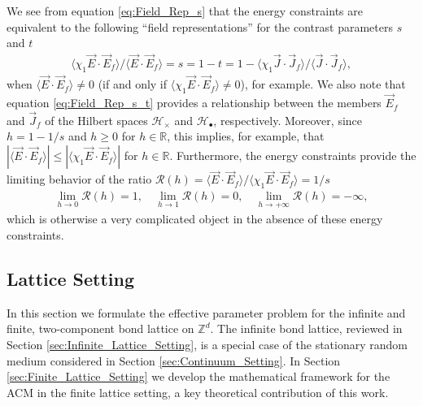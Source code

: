 \documentclass{cmslatex}
\begin{document}
 We see from equation \eqref{eq:Field_Rep_s} that the energy
 constraints are equivalent to the following ``field representations''
 for the contrast parameters $s$ and $t$
%
\begin{align}\label{eq:Field_Rep_s_t}
  \langle\chi_1\vec{E}\cdot\vec{E}_f\rangle/\langle\vec{E}\cdot\vec{E}_f\rangle
  =s=1-t
  =1- \langle\chi_1\vec{J}\cdot\vec{J}_f\rangle/\langle\vec{J}\cdot\vec{J}_f\rangle,
\end{align}
%
when $\langle\vec{E}\cdot\vec{E}_f\rangle\neq0$ (if and only if
$\langle\chi_1\vec{E}\cdot\vec{E}_f\rangle\neq0$), for example. We also note that equation 
\eqref{eq:Field_Rep_s_t} provides a relationship between the
members $\vec{E}_f$ and $\vec{J}_f$ of the Hilbert spaces
$\mathscr{H}_\times$ and $\mathscr{H}_{\bullet}$, respectively. Moreover, since
$h=1-1/s$ and $h\geq0$ for $h\in\mathbb{R}$, this implies, for example,
that $|\langle\vec{E}\cdot\vec{E}_f\rangle|\leq|\langle\chi_1\vec{E}\cdot\vec{E}_f\rangle|$ for
$h\in\mathbb{R}$. Furthermore, the energy constraints provide the
limiting behavior of the ratio
$\mathcal{R}(h)=\langle\vec{E}\cdot\vec{E}_f\rangle/\langle\chi_1\vec{E}\cdot\vec{E}_f\rangle=1/s$  
%
\begin{align*}
  \lim_{h\to0}\mathcal{R}(h)=1, \quad
  \lim_{h\to1}\mathcal{R}(h)=0, \quad
  \lim_{h\to+\infty}\mathcal{R}(h)=-\infty,
\end{align*}
%
which is otherwise a very complicated object in the absence of these
energy constraints.





\subsection{Lattice Setting}
\label{sec:Lattice_Setting}
%
In this section we formulate the effective parameter problem for the
infinite and finite, two-component bond lattice on $\mathbb{Z}^d$. The
infinite bond lattice, reviewed in Section
\ref{sec:Infinite_Lattice_Setting}, is a special case of the
stationary random medium considered in Section
\ref{sec:Continuum_Setting}. In Section
\ref{sec:Finite_Lattice_Setting} we develop the mathematical framework
for the ACM in the finite lattice setting, a key theoretical
contribution of this work. 
\end{document}
